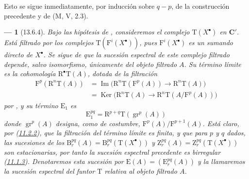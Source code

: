\documentclass[10pt,oneside,openany]{book}
\theoremstyle{egaenv}\newtheorem*{env}{---}
\theoremstyle{egastatement}
\theoremstyle{egadescription}
\newcommand{\oldpage}[2][]{\marginnote{\normalfont\scriptsize\textbf{#1}\,|\,#2}\ignorespaces}
\begin{document}
Esto se sigue inmediatamente, por inducción sobre $q-p$, de la construcción
precedente y de (M, V, 2.3).

\begin{env}[13.6.4]
\label{0.13.6.4}
\label{0.13.6.4-fr}
Bajo las hipótesis de , consideremos el complejo
$\mathrm T(X^\bullet)$ en $\boldsymbol{C}'$.
Está filtrado por los complejos
$\mathrm T(\mathrm F^i(X^\bullet))$, pues
$\mathrm F^i(X^\bullet)$ es un sumando directo de $X^\bullet$.
Se sigue de  que la \emph{sucesión espectral} de
este complejo filtrado depende, salvo isomorfismo, únicamente del
objeto filtrado $A$.
Su término límite es la cohomología $\mathrm R^\bullet\mathrm T(A)$, dotada
de la filtración
\begin{equation}
\label{0.13.6.4.1-fr}
\tag{13.6.4.1}
\begin{split}
\mathrm F^p(\mathrm R^n\mathrm T(A))
&=\operatorname{Im}\bigl(\mathrm R^n\mathrm T(\mathrm F^p(A))
\longrightarrow\mathrm R^n\mathrm T(A)\bigr)\\
&=\operatorname{Ker}\bigl(\mathrm R^n\mathrm T(A)
\longrightarrow\mathrm R^n\mathrm T(A/\mathrm F^p(A))\bigr)
\end{split}
\end{equation}
por , y su término $\mathrm E_1$ es
\begin{equation}
\label{0.13.6.4.2-fr}
\tag{13.6.4.2}
\mathrm E_1^{pq}=\mathrm R^{p+q}\mathrm T(\operatorname{gr}^p(A))
\end{equation}
donde $\operatorname{gr}^p(A)$ designa, como de costumbre, $\mathrm F^p(A)/\mathrm F^{p+1}(A)$. Está claro, por (\hyperref[0.11.2.2-fr]{11.2.2}), que la filtración del término límite es \emph{finita}, y que para $p$ y $q$ dados, las sucesiones de los
\oldpage[0\textsubscript{III}]{74}
$\mathrm B_r^{pq}(A)=\mathrm B_r^{pq}(\mathrm T(X^\bullet))$ y $\mathrm Z_r^{pq}(A)=\mathrm Z_r^{pq}(\mathrm T(X^\bullet))$ son \emph{estacionarias}, por tanto la sucesión espectral precedente es \emph{birregular} (\hyperref[0.11.1.3-fr]{11.1.3}). Denotaremos esta sucesión por $\mathrm E(A)=(\mathrm E_r^{pq}(A))$ y la llamaremos la
\emph{sucesión espectral del funtor $\mathrm T$ relativa al
objeto filtrado $A$}.
\end{env}
\end{document}
